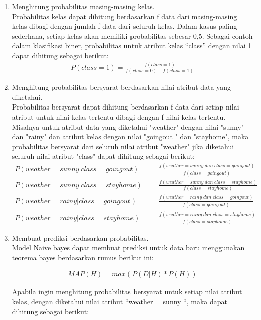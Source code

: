 \begin{enumerate}
\item Menghitung probabilitas masing-masing kelas.\\
Probabilitas kelas dapat dihitung berdasarkan f data dari masing-masing kelas dibagi dengan jumlah f data dari seluruh kelas. Dalam kasus paling sederhana, setiap kelas akan memiliki probabilitas sebesar 0,5. Sebagai contoh dalam klasifikasi biner, probabilitas untuk atribut kelas “class” dengan nilai 1 dapat dihitung sebagai berikut:
\begin{align*}
P(class=1) = \frac{f(class=1)}{f(class=0)+f(class=1)}
\end{align*}

\item Menghitung probabilitas bersyarat berdasarkan nilai atribut data yang diketahui.\\
Probabilitas bersyarat dapat dihitung berdasarkan f data dari setiap nilai atribut untuk nilai kelas tertentu dibagi dengan f nilai kelas tertentu. Misalnya untuk atribut data yang diketahui "weather" dengan nilai "sunny" dan "rainy" dan atribut kelas dengan nilai "goingout " dan "stayhome", maka probabilitas bersyarat dari seluruh nilai atribut "weather" jika diketahui seluruh nilai atribut "class" dapat dihitung sebagai berikut:\\
\begin{eqnarray*}
P(weather=sunny|class=goingout) &=& \frac{f(weather=sunny \; dan \; class=goingout)} {f(class=goingout)}\\
P(weather=sunny|class=stayhome) &=& \frac{f(weather=sunny \; dan \; class=stayhome)}{f(class = stayhome)}\\
P(weather=rainy|class=goingout) &=& \frac{f(weather=rainy \; dan \; class=goingout)} {f(class = goingout)}\\
P(weather=rainy|class=stayhome) &=& \frac{f(weather=rainy \; dan \; class=stayhome)}{f(class=stayhome)}
\end{eqnarray*}

\item Membuat prediksi berdasarkan probabilitas.\\
\noindent Model Naive bayes dapat membuat prediksi untuk data baru menggunakan teorema bayes berdasarkan rumus berikut ini:

\begin{align}
MAP(H) = max(P(D|H) * P(H))
\end{align}

\noindent Apabila ingin menghitung probabilitas bersyarat untuk setiap nilai atribut kelas, dengan diketahui nilai atribut “weather = sunny “, maka dapat dihitung sebagai berikut:


\end{enumerate}

